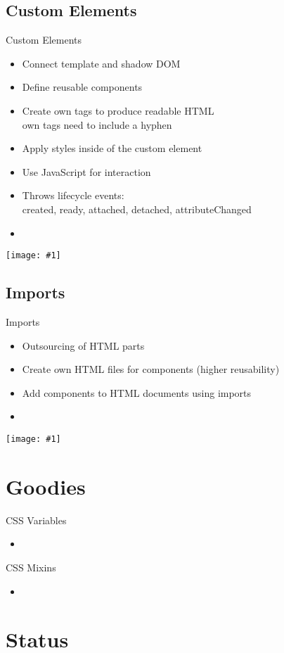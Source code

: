 \documentclass{beamer}
\newcommand{\listing}[1]{
	\begin{itemize}
		\item[]
	\end{itemize}
}
\newcommand{\myfig}[2]{
	\begin{minipage}[c]{\textwidth}
		\begin{center}
			\texttt{[image: \#1]}
		\end{center}
		\vspace{3mm}
	\end{minipage}
}
\newcommand{\slideItems}[1]{
	\begin{itemize}
		#1
	\end{itemize}
}
\newcommand{\slide}[2]{
	\begin{frame}{#1}
		#2
	\end{frame}
}
\begin{document}
\subsection{Custom Elements}

\slide{Custom Elements}{
	\slideItems{
		\item Connect template and shadow DOM
		\item Define reusable components
		\item Create own tags to produce readable HTML \\ \ding{213} own tags need to include a hyphen
		\item Apply styles inside of the custom element
		\item Use JavaScript for interaction
		\item Throws lifecycle events: \\ \ding{213} created, ready, attached, detached, attributeChanged
	}
	\listing{custom_element.html}
	\myfig{custom_element.png}{.5}
}

\subsection{Imports}

\slide{Imports}{
	\slideItems{
		\item Outsourcing of HTML parts
		\item Create own HTML files for components (higher reusability)
		\item Add components to HTML documents using imports
	}
	\listing{import.html}
	\myfig{import.png}{.5}
}

\section{Goodies}

\slide{CSS Variables}{
	\listing{css-variables.css}
}

\slide{CSS Mixins}{
	\listing{css-mixins.css}
}

\section{Status}
\end{document}
